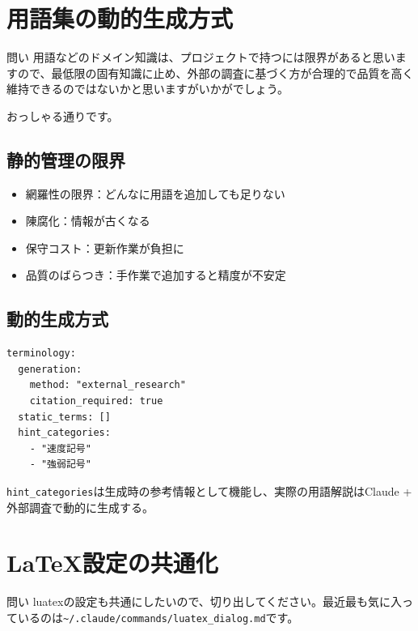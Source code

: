 \documentclass[a4paper,10pt,twocolumn]{ltjsarticle}
\begin{document}
\section{用語集の動的生成方式}

\begin{itembox}[l]{問い}
用語などのドメイン知識は、プロジェクトで持つには限界があると思いますので、最低限の固有知識に止め、外部の調査に基づく方が合理的で品質を高く維持できるのではないかと思いますがいかがでしょう。
\end{itembox}

おっしゃる通りです。

\subsection{静的管理の限界}

\begin{itemize}[noitemsep]
    \item 網羅性の限界：どんなに用語を追加しても足りない
    \item 陳腐化：情報が古くなる
    \item 保守コスト：更新作業が負担に
    \item 品質のばらつき：手作業で追加すると精度が不安定
\end{itemize}

\subsection{動的生成方式}

\begin{verbatim}
terminology:
  generation:
    method: "external_research"
    citation_required: true
  static_terms: []
  hint_categories:
    - "速度記号"
    - "強弱記号"
\end{verbatim}

\texttt{hint\_categories}は生成時の参考情報として機能し、実際の用語解説はClaude + 外部調査で動的に生成する。

\section{LaTeX設定の共通化}

\begin{itembox}[l]{問い}
luatexの設定も共通にしたいので、切り出してください。最近最も気に入っているのは\texttt{\~{}/.claude/commands/luatex\_dialog.md}です。
\end{itembox}
\end{document}
